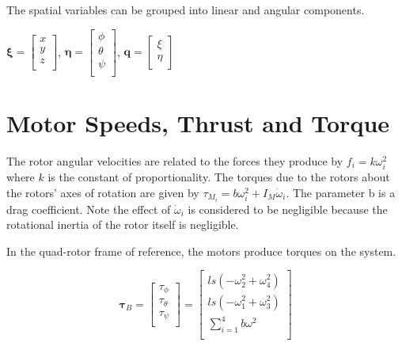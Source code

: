 The spatial variables can be grouped into linear and angular components.

$\boldsymbol \xi = \left[ \begin{array}{c}
x\\y\\z\\
\end{array} \right] $, $\boldsymbol \eta =  \left[ \begin{array}{c}
\phi\\\theta\\\psi\\
\end{array} \right] $, $\boldsymbol q = \left[ \begin{array}{c}
\xi\\\eta\\
\end{array} \right]$\\


\section{Motor Speeds, Thrust and Torque}

\indent The rotor angular velocities are related to the forces they produce by $f_i = k \omega^2_i$ where $k$ is the constant of proportionality.
The torques due to the rotors about the rotors' axes of rotation are given by $\tau_{M_i} = b \omega^2_i + I_M \dot{\omega}_i$. The parameter b is a drag coefficient. Note the effect of $\dot{\omega}_i$ is considered to be negligible because the rotational inertia of the rotor itself is negligible.

In the quad-rotor frame of reference, the motors produce torques on the system.

\begin{equation}
    \label{taub}
    \boldsymbol \tau_B = \left[ \begin{array}{c} \tau_{\phi}\\\tau_{\theta}\\\tau_{\psi}\\ \end{array} \right] = \left[ \begin{array}{c} l s (-\omega_2^2 + \omega_4^2)\\l s (-\omega_1^2 + \omega_3^2)\\ \displaystyle \sum \limits_{i=1}^4 b \omega^2\\\end{array} \right]
\end{equation}

